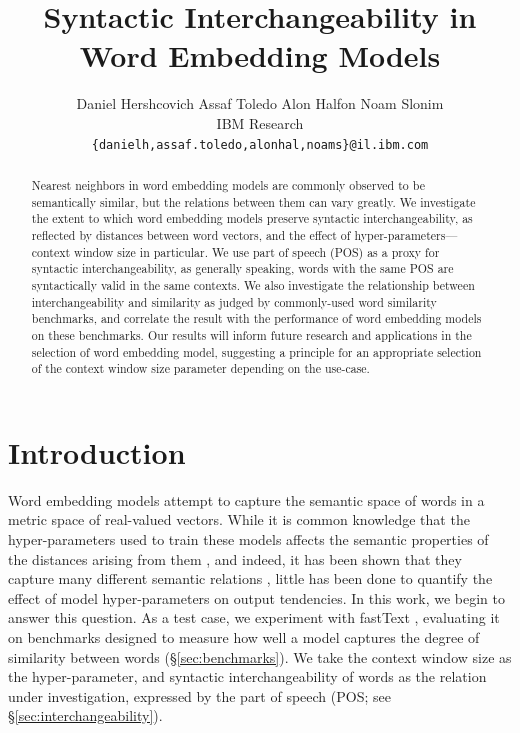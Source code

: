 \documentclass[11pt,a4paper]{article}
\title{Syntactic Interchangeability in Word Embedding Models}
\author{
Daniel Hershcovich \qquad Assaf Toledo \qquad Alon Halfon \qquad Noam Slonim \\
IBM Research\\
\texttt{\{danielh,assaf.toledo,alonhal,noams\}@il.ibm.com}
}
\begin{document}
    \maketitle

    \begin{abstract}
    Nearest neighbors in word embedding models are commonly observed to be
    semantically similar, but the relations between them can vary greatly.
    We investigate the extent to which word embedding models
    preserve syntactic interchangeability, as reflected by distances between
    word vectors, and the effect of hyper-parameters---context window size in particular.
    We use part of speech (POS) as a proxy for syntactic interchangeability,
    as generally speaking, words with the same POS are syntactically valid in the same contexts.
    We also investigate the relationship between interchangeability
    and similarity as judged by commonly-used word similarity benchmarks,
    and correlate the result with the performance of word embedding models
    on these benchmarks.
    Our results will inform future research and applications in the selection
    of word embedding model, suggesting a principle for an appropriate selection
    of the context window size parameter depending on the use-case.
    \end{abstract}

    \section{Introduction}\label{sec:introduction}

    Word embedding models \cite{mikolov2013efficient,pennington2014glove,levy2015improving}
    attempt to capture the semantic space of words
    in a metric space of real-valued vectors.
    While it is common knowledge that the hyper-parameters used to train these
    models affects the semantic properties of the distances arising from them
    \cite{goldberg2016primer}, and indeed, it has been shown that
    they capture many different semantic relations \cite{yang2006verb,agirre2009study},
    little has been done to quantify the
    effect of model hyper-parameters on output tendencies.
    In this work, we begin to answer this question.
    As a test case, we experiment with fastText \cite{bojanowski2016enriching},
    evaluating it on benchmarks designed to measure how well a model captures the degree
    of similarity between words (\S\ref{sec:benchmarks}).
    We take the context window size as the hyper-parameter,
    and syntactic interchangeability of words as the relation under investigation,
    expressed by the part of speech (POS; see \S\ref{sec:interchangeability}).
    
\end{document}
